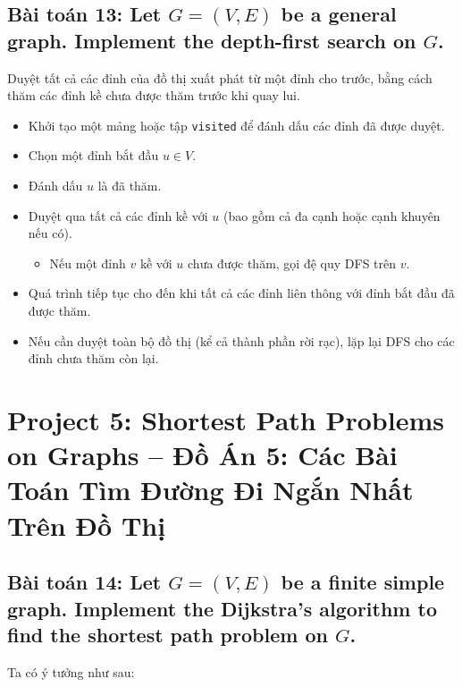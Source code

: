 \documentclass{article}
\begin{document}
	\subsection*{Bài toán 13: Let $G = (V,E)$ be a general graph. Implement the depth-first search on $G$.}
	
	Duyệt tất cả các đỉnh của đồ thị xuất phát từ một đỉnh cho trước, bằng cách thăm các đỉnh kề chưa được thăm trước khi quay lui.
	
	\begin{itemize}
		\item Khởi tạo một mảng hoặc tập \texttt{visited} để đánh dấu các đỉnh đã được duyệt.
		\item Chọn một đỉnh bắt đầu $u \in V$.
		\item Đánh dấu $u$ là đã thăm.
		\item Duyệt qua tất cả các đỉnh kề với $u$ (bao gồm cả đa cạnh hoặc cạnh khuyên nếu có).
		\begin{itemize}
			\item Nếu một đỉnh $v$ kề với $u$ chưa được thăm, gọi đệ quy DFS trên $v$.
		\end{itemize}
		\item Quá trình tiếp tục cho đến khi tất cả các đỉnh liên thông với đỉnh bắt đầu đã được thăm.
		\item Nếu cần duyệt toàn bộ đồ thị (kể cả thành phần rời rạc), lặp lại DFS cho các đỉnh chưa thăm còn lại.
	\end{itemize}
	
	\section*{Project 5: Shortest Path Problems on Graphs -- Đồ Án 5: Các Bài Toán Tìm Đường Đi Ngắn Nhất Trên Đồ Thị}
	
	\subsection*{Bài toán 14: Let $G = (V,E)$ be a finite simple graph. Implement the Dijkstra's algorithm to find the shortest path problem on $G$.}
	
	Ta có ý tưởng như sau:
	
\end{document}
